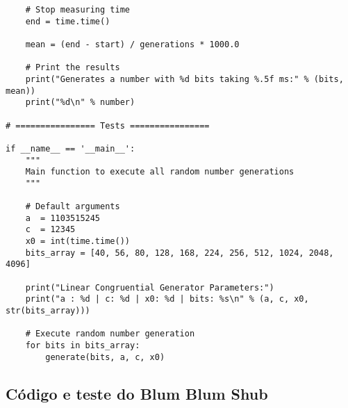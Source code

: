 \documentclass{article}
\begin{document}
\begin{lstlisting}
	# Stop measuring time
	end = time.time()

	mean = (end - start) / generations * 1000.0

	# Print the results
	print("Generates a number with %d bits taking %.5f ms:" % (bits, mean))
	print("%d\n" % number)

# ================ Tests ================

if __name__ == '__main__':
	"""
	Main function to execute all random number generations
	"""

	# Default arguments
	a  = 1103515245
	c  = 12345
	x0 = int(time.time())
	bits_array = [40, 56, 80, 128, 168, 224, 256, 512, 1024, 2048, 4096]

	print("Linear Congruential Generator Parameters:")
	print("a : %d | c: %d | x0: %d | bits: %s\n" % (a, c, x0, str(bits_array)))

	# Execute random number generation
	for bits in bits_array:
		generate(bits, a, c, x0)
\end{lstlisting}

\pagebreak

\subsection{Código e teste do Blum Blum Shub}
\label{bbs-full}
\end{document}
